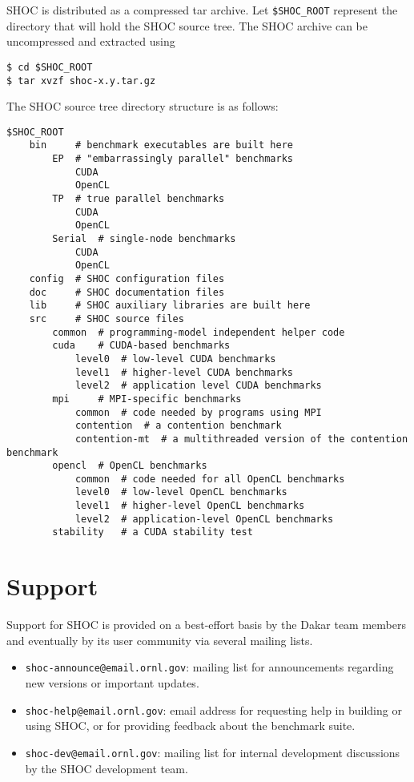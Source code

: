 \documentclass[11pt]{article}
\begin{document}
SHOC is distributed as a compressed tar archive.
Let \verb+$SHOC_ROOT+ represent the directory that will hold the SHOC source
tree.
The SHOC archive can be uncompressed and extracted using 
\begin{Verbatim}[frame=single]
$ cd $SHOC_ROOT
$ tar xvzf shoc-x.y.tar.gz
\end{Verbatim}

\pagebreak

The SHOC source tree directory structure is as follows:

\begin{Verbatim}[frame=single]
$SHOC_ROOT
    bin     # benchmark executables are built here
        EP  # "embarrassingly parallel" benchmarks
            CUDA
            OpenCL
        TP  # true parallel benchmarks
            CUDA
            OpenCL
        Serial  # single-node benchmarks
            CUDA
            OpenCL
    config  # SHOC configuration files
    doc     # SHOC documentation files
    lib     # SHOC auxiliary libraries are built here
    src     # SHOC source files
        common  # programming-model independent helper code
        cuda    # CUDA-based benchmarks
            level0  # low-level CUDA benchmarks
            level1  # higher-level CUDA benchmarks
            level2  # application level CUDA benchmarks
        mpi     # MPI-specific benchmarks
            common  # code needed by programs using MPI
            contention  # a contention benchmark
            contention-mt  # a multithreaded version of the contention benchmark
        opencl  # OpenCL benchmarks
            common  # code needed for all OpenCL benchmarks
            level0  # low-level OpenCL benchmarks
            level1  # higher-level OpenCL benchmarks
            level2  # application-level OpenCL benchmarks
        stability   # a CUDA stability test
\end{Verbatim}

\section{Support}\label{sec:support}

Support for SHOC is provided on a best-effort basis by the Dakar team members
and eventually by its user community via several mailing lists.
\begin{itemize}
\item \verb+shoc-announce@email.ornl.gov+: mailing list for announcements
regarding new versions or important updates.
\item \verb+shoc-help@email.ornl.gov+: email address for requesting
help in building or using SHOC, or for providing feedback about the benchmark 
suite.
\item \verb+shoc-dev@email.ornl.gov+: mailing list for internal 
development discussions by the SHOC development team.
\end{itemize}
\end{document}
